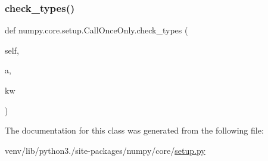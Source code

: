 \subsubsection{\texorpdfstring{check\+\_\+types()}{check\_types()}}
{\footnotesize\ttfamily def numpy.\+core.\+setup.\+Call\+Once\+Only.\+check\+\_\+types (\begin{DoxyParamCaption}\item[{}]{self,  }\item[{}]{a,  }\item[{}]{kw }\end{DoxyParamCaption})}



The documentation for this class was generated from the following file\+:\begin{DoxyCompactItemize}
\item 
venv/lib/python3./site-\/packages/numpy/core/\hyperlink{numpy_2core_2setup_8py}{setup.\+py}\end{DoxyCompactItemize}
